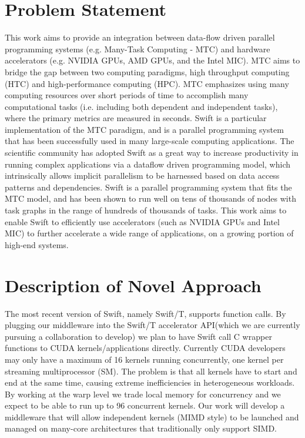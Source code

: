 \documentclass[conference]{IEEEtran}
\begin{document}
\section{Problem Statement}
This work aims to provide an integration between data-flow driven parallel programming systems (e.g. Many-Task Computing - MTC) and hardware accelerators \cite{kriederGCASR12} (e.g. NVIDIA GPUs, AMD GPUs, and the Intel MIC). MTC aims to bridge the gap between two computing paradigms, high throughput computing (HTC) and high-performance computing (HPC). MTC emphasizes using many computing resources over short periods of time to accomplish many computational tasks (i.e. including both dependent and independent tasks), where the primary metrics are measured in seconds.\cite{raicu2008toward} Swift is a particular implementation of the MTC paradigm, and is a parallel programming system that has been successfully used in many large-scale computing applications. \cite{zhao2007swift} The scientific community has adopted Swift as a great way to increase productivity in running complex applications via a dataflow driven programming model, which intrinsically allows implicit parallelism to be harnessed based on data access patterns and dependencies. Swift is a parallel programming system that fits the MTC model, and has been shown to run well on tens of thousands of nodes with task graphs in the range of hundreds of thousands of tasks. This work aims to enable Swift to efficiently use accelerators (such as NVIDIA GPUs and Intel MIC) to further accelerate a wide range of applications, on a growing portion of high-end systems.
\section{Description of Novel Approach}
The most recent version of Swift, namely Swift/T, supports function calls.\cite{wozniak13swift} By plugging our middleware into the Swift/T accelerator API(which we are currently pursuing a collaboration to develop) we plan to have Swift call C wrapper functions to CUDA kernels/applications directly. Currently CUDA developers may only have a maximum of 16 kernels running concurrently, one kernel per streaming multiprocessor (SM). The problem is that all kernels have to start and end at the same time, causing extreme inefficiencies in heterogeneous workloads. By working at the warp level we trade local memory for concurrency and we expect to be able to run up to 96 concurrent kernels. Our work will develop a middleware that will allow independent kernels (MIMD style) to be launched and managed on many-core architectures that traditionally only support SIMD. \cite{kriederXSEDE12}
\end{document}
